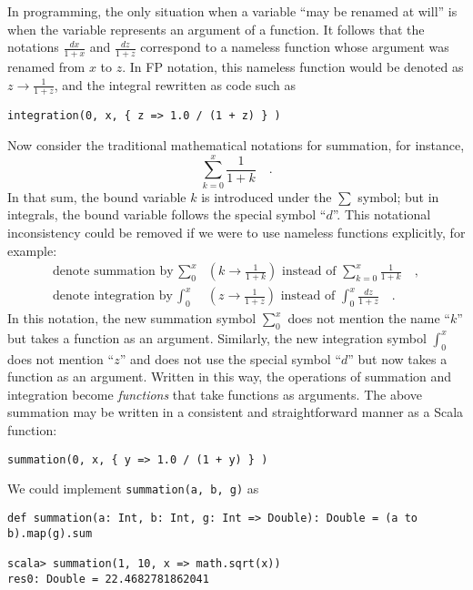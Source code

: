 In programming, the only situation when a variable \textsf{``}may be renamed
at will\textsf{''} is when the variable represents an argument of a function.
It follows that the notations $\frac{dx}{1+x}$ and $\frac{dz}{1+z}$
correspond to a nameless function whose argument was renamed from
$x$ to $z$. In FP notation, this nameless function would be denoted
as $z\rightarrow\frac{1}{1+z}$, and the integral rewritten as code
such as
\begin{lstlisting}
integration(0, x, { z => 1.0 / (1 + z) } )
\end{lstlisting}
Now consider the traditional mathematical notations for summation,
for instance,
\[
\sum_{k=0}^{x}\frac{1}{1+k}\quad.
\]
In that sum, the bound variable $k$ is introduced under the $\sum$
symbol; but in integrals, the bound variable follows the special symbol
\textsf{``}$d$\textsf{''}. This notational inconsistency could be removed if we were
to use nameless functions explicitly, for example:
\begin{align*}
\text{denote summation by }\sum_{0}^{x} & \left(k\rightarrow\frac{1}{1+k}\right)\text{ instead of }\sum_{k=0}^{x}\frac{1}{1+k}\quad,\\
\text{denote integration by }\int_{0}^{x} & \left(z\rightarrow\frac{1}{1+z}\right)\text{ instead of }\int_{0}^{x}\frac{dz}{1+z}\quad.
\end{align*}
In this notation, the new summation symbol $\sum_{0}^{x}$ does not
mention the name \textsf{``}$k$\textsf{''} but takes a function as an argument. Similarly,
the new integration symbol $\int_{0}^{x}$ does not mention \textsf{``}$z$\textsf{''}
and does not use the special symbol \textsf{``}$d$\textsf{''} but now takes a function
as an argument. Written in this way, the operations of summation and
integration become \emph{functions} that take functions as arguments.
The above summation may be written in a consistent and straightforward
manner as a Scala function:
\begin{lstlisting}
summation(0, x, { y => 1.0 / (1 + y) } )
\end{lstlisting}

We could implement \texttt{}\lstinline!summation(a, b, g)! as
\begin{lstlisting}
def summation(a: Int, b: Int, g: Int => Double): Double = (a to b).map(g).sum

scala> summation(1, 10, x => math.sqrt(x))
res0: Double = 22.4682781862041
\end{lstlisting}

